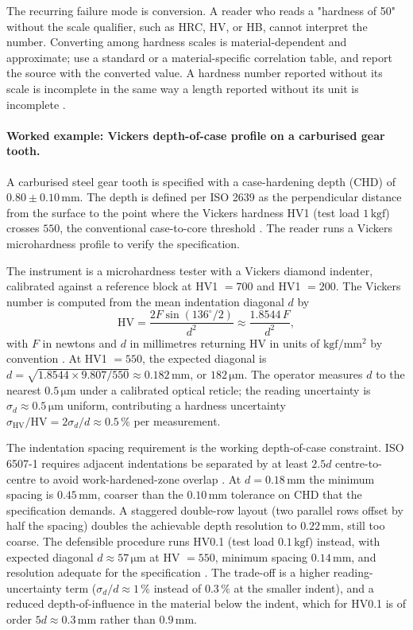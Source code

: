 The recurring failure mode is conversion. A reader who reads a
"hardness of 50" without the scale qualifier, such as HRC, HV, or
HB, cannot interpret the number. Converting among hardness scales
is material-dependent and approximate; use a standard or a
material-specific correlation table, and report the source with the
converted value. A hardness number reported without its scale is
incomplete in the same way a length reported without its unit is
incomplete \cite{text:ashby2017}.

\paragraph{Worked example: Vickers depth-of-case profile on a
carburised gear tooth.}
A carburised steel gear tooth is specified with a case-hardening
depth (CHD) of $0.80 \pm 0.10 \,\si{\milli\meter}$. The depth is
defined per ISO 2639 as the perpendicular distance from the
surface to the point where the Vickers hardness HV1 (test load
$1 \,\text{kgf}$) crosses $550$, the conventional
case-to-core threshold \cite{ch07-std:iso-2639-2002}. The reader
runs a Vickers microhardness profile to verify the specification.

The instrument is a microhardness tester with a Vickers diamond
indenter, calibrated against a reference block at HV1 $= 700$ and
HV1 $= 200$. The Vickers number is computed from the mean
indentation diagonal $d$ by
\[
\mathrm{HV} = \frac{2 F \sin(136^{\circ}/2)}{d^{2}} \approx
\frac{1.8544 \, F}{d^{2}},
\]
with $F$ in newtons and $d$ in millimetres returning HV in
units of $\text{kgf}/\text{mm}^{2}$ by
convention \cite{ch07-std:iso-6507-1-2023}. At HV1 $= 550$, the
expected diagonal is $d = \sqrt{1.8544 \times 9.807 / 550} \approx
0.182 \,\si{\milli\meter}$, or $182 \,\si{\micro\meter}$. The
operator measures $d$ to the nearest $0.5 \,\si{\micro\meter}$
under a calibrated optical reticle; the reading uncertainty is
$\sigma_{d} \approx 0.5 \,\si{\micro\meter}$ uniform, contributing
a hardness uncertainty $\sigma_{\mathrm{HV}} / \mathrm{HV} =
2 \sigma_{d} / d \approx 0.5\,\%$ per measurement.

The indentation spacing requirement is the working depth-of-case
constraint. ISO 6507-1 requires adjacent indentations be separated
by at least $2.5 d$ centre-to-centre to avoid work-hardened-zone
overlap \cite{ch07-std:iso-6507-1-2023}. At $d = 0.18 \,\si{\milli
\meter}$ the minimum spacing is $0.45 \,\si{\milli\meter}$,
coarser than the $0.10 \,\si{\milli\meter}$ tolerance on CHD that
the specification demands. A staggered double-row layout (two
parallel rows offset by half the spacing) doubles the achievable
depth resolution to $0.22 \,\si{\milli\meter}$, still too coarse.
The defensible procedure runs HV0.1 (test load $0.1 \,\text{kgf}$)
instead, with expected diagonal $d \approx 57 \,\si
{\micro\meter}$ at HV $= 550$, minimum spacing $0.14 \,\si{\milli
\meter}$, and resolution adequate for the specification
\cite{ch07-std:astm-e384-2022}. The trade-off is a higher
reading-uncertainty term ($\sigma_{d} / d \approx 1\,\%$ instead of
$0.3\,\%$ at the smaller indent), and a reduced depth-of-influence
in the material below the indent, which for HV0.1 is of order
$5 d \approx 0.3 \,\si{\milli\meter}$ rather than $0.9 \,\si{\milli
\meter}$.

